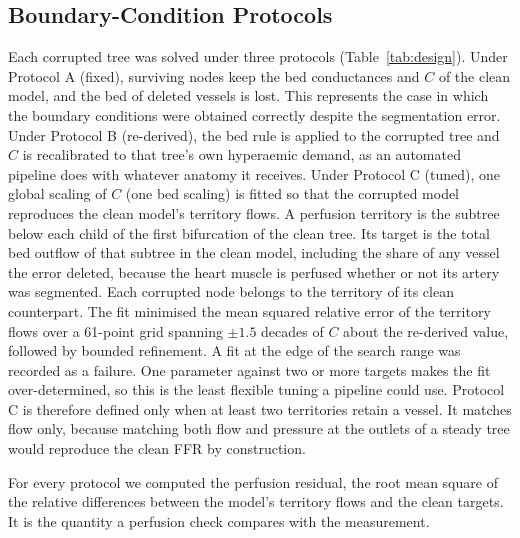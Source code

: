 \documentclass[journal]{IEEEtran}
\begin{document}
\subsection{Boundary-Condition Protocols}
Each corrupted tree was solved under three protocols (Table~\ref{tab:design}). Under Protocol A (fixed), surviving
nodes keep the bed conductances and $C$ of the clean model, and the bed of deleted vessels is lost. This represents
the case in which the boundary conditions were obtained correctly despite the segmentation error. Under Protocol B
(re-derived), the bed rule is applied to the corrupted tree and $C$ is recalibrated to that tree's own hyperaemic
demand, as an automated pipeline does with whatever anatomy it receives. Under Protocol C (tuned), one global
scaling of $C$ (one bed scaling) is fitted so that the corrupted model reproduces the clean model's territory
flows. A perfusion territory is the subtree below each child of
the first bifurcation of the clean tree. Its target is the total bed outflow of that subtree in the clean model,
including the share of any vessel the error deleted, because the heart muscle is perfused whether or not its artery
was segmented. Each corrupted node belongs to the territory of its clean counterpart. The fit minimised the mean
squared relative error of the territory flows over a 61-point grid spanning $\pm 1.5$ decades of $C$ about the
re-derived value, followed by bounded refinement. A fit at the edge of the search range was recorded as a failure.
One parameter against two or more targets makes the fit over-determined, so this is the least flexible tuning a
pipeline could use. Protocol C is therefore defined only when at least two territories retain a vessel. It matches
flow only, because matching both flow and pressure at the outlets of a steady tree would reproduce the clean FFR by
construction.

For every protocol we computed the perfusion residual, the root mean square of the relative differences between the
model's territory flows and the clean targets. It is the quantity a perfusion check compares with the measurement.
\end{document}
